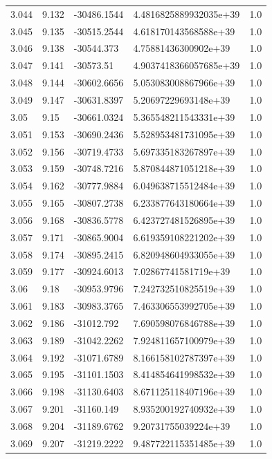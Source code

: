 \begin{tabular}{lllll}
3.044 & 9.132 & -30486.1544 & 4.4816825889932035e+39 & 1.0 \\
3.045 & 9.135 & -30515.2544 & 4.618170143568588e+39 & 1.0 \\
3.046 & 9.138 & -30544.373 & 4.75881436300902e+39 & 1.0 \\
3.047 & 9.141 & -30573.51 & 4.9037418366057685e+39 & 1.0 \\
3.048 & 9.144 & -30602.6656 & 5.053083008867966e+39 & 1.0 \\
3.049 & 9.147 & -30631.8397 & 5.20697229693148e+39 & 1.0 \\
3.05 & 9.15 & -30661.0324 & 5.365548211543331e+39 & 1.0 \\
3.051 & 9.153 & -30690.2436 & 5.528953481731095e+39 & 1.0 \\
3.052 & 9.156 & -30719.4733 & 5.697335183267897e+39 & 1.0 \\
3.053 & 9.159 & -30748.7216 & 5.870844871051218e+39 & 1.0 \\
3.054 & 9.162 & -30777.9884 & 6.049638715512484e+39 & 1.0 \\
3.055 & 9.165 & -30807.2738 & 6.233877643180664e+39 & 1.0 \\
3.056 & 9.168 & -30836.5778 & 6.423727481526895e+39 & 1.0 \\
3.057 & 9.171 & -30865.9004 & 6.619359108221202e+39 & 1.0 \\
3.058 & 9.174 & -30895.2415 & 6.820948604933055e+39 & 1.0 \\
3.059 & 9.177 & -30924.6013 & 7.02867741581719e+39 & 1.0 \\
3.06 & 9.18 & -30953.9796 & 7.242732510825519e+39 & 1.0 \\
3.061 & 9.183 & -30983.3765 & 7.463306553992705e+39 & 1.0 \\
3.062 & 9.186 & -31012.792 & 7.690598076846788e+39 & 1.0 \\
3.063 & 9.189 & -31042.2262 & 7.924811657100979e+39 & 1.0 \\
3.064 & 9.192 & -31071.6789 & 8.166158102787397e+39 & 1.0 \\
3.065 & 9.195 & -31101.1503 & 8.414854641998532e+39 & 1.0 \\
3.066 & 9.198 & -31130.6403 & 8.671125118407196e+39 & 1.0 \\
3.067 & 9.201 & -31160.149 & 8.935200192740932e+39 & 1.0 \\
3.068 & 9.204 & -31189.6762 & 9.20731755039224e+39 & 1.0 \\
3.069 & 9.207 & -31219.2222 & 9.487722115351485e+39 & 1.0 \\

\end{tabular}
